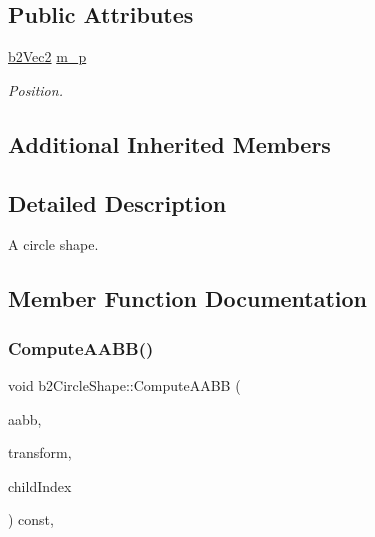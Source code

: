 \subsection*{Public Attributes}
\begin{DoxyCompactItemize}
\item 
\mbox{\label{classb2_circle_shape_a190705618b2e65f636f1dc03c63640ff}} 
\hyperlink{structb2_vec2}{b2\+Vec2} \hyperlink{classb2_circle_shape_a190705618b2e65f636f1dc03c63640ff}{m\+\_\+p}
\begin{DoxyCompactList}\small\item\em Position. \end{DoxyCompactList}\end{DoxyCompactItemize}
\subsection*{Additional Inherited Members}


\subsection{Detailed Description}
A circle shape. 

\subsection{Member Function Documentation}
\mbox{\label{classb2_circle_shape_af4a4ea78780af7a7ce40bf5d54affe83}} 
\subsubsection{\texorpdfstring{Compute\+A\+A\+B\+B()}{ComputeAABB()}}
{\footnotesize\ttfamily void b2\+Circle\+Shape\+::\+Compute\+A\+A\+BB (\begin{DoxyParamCaption}\item[{\hyperlink{structb2_a_a_b_b}{b2\+A\+A\+BB} $\ast$}]{aabb,  }\item[{const \hyperlink{structb2_transform}{b2\+Transform} \&}]{transform,  }\item[{int32}]{child\+Index }\end{DoxyParamCaption}) const\hspace{0.3cm}{\ttfamily [override]}, {\ttfamily [virtual]}}

